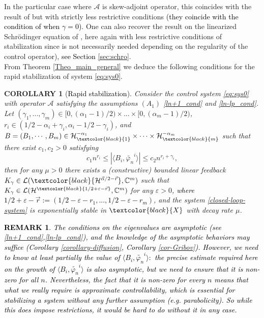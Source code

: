 \documentclass[11pt, dvipsnames]{amsart}
\newtheorem{rmk}[theorem]{REMARK}
\newtheorem{corollary}[theorem]{COROLLARY}
\begin{document}
In the particular case where $\mathcal{A}$ is skew-adjoint operator, this coincides with the result of \cite{Gagnon2022-fredholm}  but with strictly less restrictive conditions
\textcolor{black}{(they coincide with the condition of \cite{Gagnon2022-fredholm} when $\gamma=0$)}. One can also recover the result on the linearized Schrödinger equation of \cite{Coron2018-rapid}, here again with less restrictive conditions of stabilization since \cite[Hypothesis 1.1]{Coron2018-rapid} is not necessarily needed depending on the regularity of the control operator), \textcolor{black}{see Section \ref{sec:schro}}. \\
 
From Theorem \ref{Theo_main_general} we deduce the following conditions for the rapid stabilization of system \ref{eq:sys0}.
\begin{corollary}[\textcolor{black}{Rapid stabilization}]
\label{cor:expstab}
Consider the control system \eqref{eq:sys0} with operator $\mathcal{A}$ satisfying the assumptions $(A_{1})$  \eqref{ln+1_cond} and \eqref{ln-lp_cond}.  Let $(\gamma_{1},...,\gamma_{m})\in [0,(\alpha_{1}-1)/2)\times ...\times [0,(\alpha_{m}-1)/2)$, $r_{i}\in(1/2-\alpha_{i}+\gamma_{i},\alpha_{i}-1/2-\gamma_{i})$, and $B=(B_1,\cdots,B_m)\in\mathcal{H}_{\textcolor{black}{1}}^{-\alpha_1}\times \cdots\times \mathcal{H}_{\textcolor{black}{m}}^{-\alpha_m}$ such that there exist $c_1, c_2>0$ satisfying
\begin{equation}
\label{eq:condbsup}
   c_1n^{r_{i}}
   \leq |\langle B_i,\widetilde{\varphi_n}^i\rangle|\leq c_2 n^{r_{i}+\gamma_{i}},
\end{equation}
then for any $\mu>0$ there exists a (constructive) bounded linear feedback $K_{\gamma}\in \mathcal{L}(\textcolor{black}{\mathcal{H}^{\vec{\alpha}/2-\vec{r}}},\mathbb{C}^m)$ such that $K_{\gamma}\in \mathcal{L}(\mathcal{H}^{\textcolor{black}{1/2+\varepsilon-\vec{r}}},\mathbb{C}^m)$ for any $\varepsilon>0$, \textcolor{black}{where
$1/2+\varepsilon-\vec{r} := (1/2-\varepsilon -r_{1},...,1/2-\varepsilon-r_{m})$},
and the system \eqref{closed-loop-system} is exponentially stable in $\textcolor{black}{X}$ with decay rate $\mu$.
\end{corollary}




\textcolor{black}{
\begin{rmk}
    The conditions on the eigenvalues are asymptotic (see \eqref{ln+1_cond},\eqref{ln-lp_cond}), and  
    the knowledge of the asymptotic behaviors may suffice (Corollary \ref{corollary-diffusion}, Corollary \ref{cor-Gribov}). However, we need to know at least partially the value of $\langle B_i, \widetilde{\varphi_n}^i\rangle:$ the precise estimate required here on the growth of $\langle B_i, \widetilde{\varphi_n}^i\rangle$ is also asymptotic, but we need to ensure that it is non-zero for all $n$. 
    Nevertheless, the fact that it is non-zero for every $n$ means that \textcolor{black}{what} we really require is approximate controllability, which is essential for stabilizing a system without any further assumption (e.g. parabolicity). So while this does impose restrictions, it would be hard to do without it in any case.
\end{rmk}
}
\end{document}
